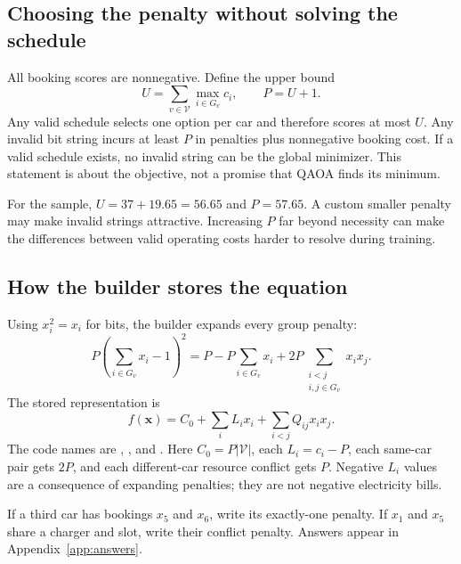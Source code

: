 \subsection{Choosing the penalty without solving the schedule}
All booking scores are nonnegative. Define the upper bound
\begin{equation}\label{eq:penalty-bound}
U=\sum_{v\in\mathcal V}\max_{i\in G_v}c_i,
\qquad P=U+1.
\end{equation}
Any valid schedule selects one option per car and therefore scores at most $U$.
Any invalid bit string incurs at least $P$ in penalties plus nonnegative booking
cost. If a valid schedule exists, no invalid string can be the global minimizer.
This statement is about the objective, not a promise that QAOA finds its minimum.

For the sample, $U=37+19.65=56.65$ and $P=57.65$. A custom smaller penalty may
make invalid strings attractive. Increasing $P$ far beyond necessity can make
the differences between valid operating costs harder to resolve during training.

\subsection{How the builder stores the equation}
Using $x_i^2=x_i$ for bits, the builder expands every group penalty:
\begin{equation}\label{eq:group-expansion}
P\left(\sum_{i\in G_v}x_i-1\right)^2
=P-P\sum_{i\in G_v}x_i
+2P\sum_{\substack{i<j\\i,j\in G_v}}x_i x_j.
\end{equation}
The stored representation is
\begin{equation}\label{eq:expanded-qubo}
f(\boldsymbol{x})=C_0+\sum_i L_i x_i+\sum_{i<j}Q_{ij}x_i x_j.
\end{equation}
The code names are , , and .
Here $C_0=P|\mathcal V|$, each $L_i=c_i-P$, each same-car pair gets $2P$, and
each different-car resource conflict gets $P$. Negative $L_i$ values are a
consequence of expanding penalties; they are not negative electricity bills.

\begin{checkpoint}
If a third car has bookings $x_5$ and $x_6$, write its exactly-one penalty.
If $x_1$ and $x_5$ share a charger and slot, write their conflict penalty.
Answers appear in Appendix~\ref{app:answers}.
\end{checkpoint}
